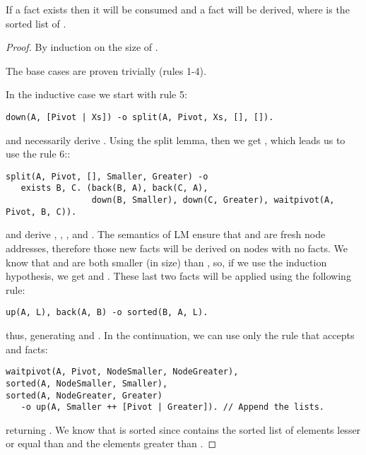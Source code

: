 \begin{theorem}
If a  fact exists then it will be consumed and a  fact will be derived, where  is the sorted list of .
\end{theorem}
\begin{proof}
By induction on the size of .

The base cases are proven trivially (rules 1-4).

In the inductive case we start with rule 5:
\begin{Verbatim}[fontsize=\codesize]
down(A, [Pivot | Xs]) -o split(A, Pivot, Xs, [], []).
\end{Verbatim}

and necessarily derive . Using the split
lemma, then we get , which leads us
to use the rule 6::

\begin{Verbatim}[fontsize=\codesize]
split(A, Pivot, [], Smaller, Greater) -o
   exists B, C. (back(B, A), back(C, A),
                 down(B, Smaller), down(C, Greater), waitpivot(A, Pivot, B, C)).
\end{Verbatim}

and derive , , ,
 and . The semantics of
LM ensure that  and  are fresh node addresses, therefore those
new facts will be derived on nodes with no facts. We know that 
and  are both smaller (in size) than , so, if we use the
induction hypothesis, we get  and .
These last two facts will be applied using the following rule:

\begin{Verbatim}[fontsize=\codesize]
up(A, L), back(A, B) -o sorted(B, A, L).
\end{Verbatim}

thus, generating  and . In the continuation, we can use only the rule that accepts
 and  facts:

\begin{Verbatim}[fontsize=\codesize]
waitpivot(A, Pivot, NodeSmaller, NodeGreater),
sorted(A, NodeSmaller, Smaller),
sorted(A, NodeGreater, Greater)
   -o up(A, Smaller ++ [Pivot | Greater]). // Append the lists.
\end{Verbatim}

returning .  We know that
 is sorted since  contains the
sorted list of elements lesser or equal than  and 
the elements greater than .

\end{proof}


